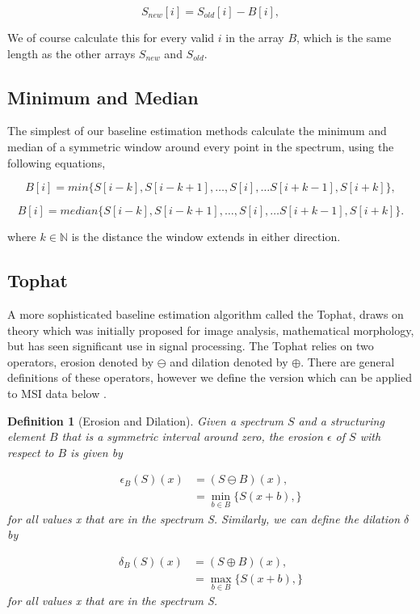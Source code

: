 \documentclass[11pt,openany]{book}
\newtheorem{definition}{Definition}
\begin{document}
\begin{equation}
    S_{new}[i] = S_{old}[i] - B[i],
    \label{eqn:subtract_baseline}
\end{equation}

We of course calculate this for every valid $i$ in the array $B$, which is the same length as the other arrays $S_{new}$ and $S_{old}$.

\subsection{Minimum and Median}
The simplest of our baseline estimation methods calculate the minimum and median of a symmetric window around every point in the spectrum, using the following equations,

\begin{equation}
    B[i] = min\{ S[i-k], S[i-k+1], \dots , S[i], \dots S[i+k-1], S[i+k] \}, 
    \label{eqn:minimum_baseline_estimation}
\end{equation}

\begin{equation}
    B[i] = median\{ S[i-k], S[i-k+1], \dots , S[i], \dots S[i+k-1], S[i+k] \}.
    \label{eqn:median_baseline_estimation}
\end{equation}

where $k \in \mathbb{N}$ is the distance the window extends in either direction.

\subsection{Tophat}
A more sophisticated baseline estimation algorithm called the Tophat, draws on theory which was initially proposed for image analysis, mathematical morphology, but has seen significant use in signal processing. The Tophat relies on two operators, erosion denoted by $\ominus$ and dilation denoted by $\oplus$. There are general definitions of these operators, however we define the version which can be applied to MSI data below \cite{baseline_morphology_paper}.

\begin{definition}[Erosion and Dilation]
    Given a spectrum $S$ and a structuring element $B$ that is a symmetric interval around zero, the erosion $\epsilon$ of $S$ with respect to $B$ is given by
    
    \begin{align}
        \epsilon_{B}(S)(x)      &= (S \ominus B) (x),\\
                                &= \min_{b \in B} \{ S(x + b), \}
    \end{align}
    for all values x that are in the spectrum S. Similarly, we can define the dilation $\delta$ by
    
    \begin{align}
        \delta_{B}(S)(x)    &= (S \oplus B) (x),\\
                            &= \max_{b \in B} \{ S(x + b), \}
    \end{align}
    for all values x that are in the spectrum S.
    \label{defn:erosion_and_dilation}
\end{definition}
\end{document}
